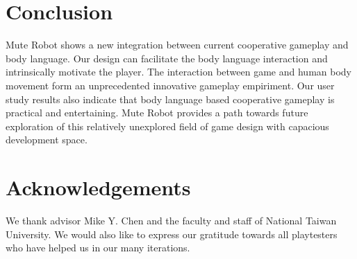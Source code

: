 \documentclass{chi-ext}
\begin{document}

\section{Conclusion}
Mute Robot shows a new integration between current cooperative gameplay and body language.
Our design can facilitate the body language interaction and intrinsically motivate the player.
The interaction between game and human body movement form an unprecedented innovative gameplay empiriment.
Our user study results also indicate that body language based cooperative gameplay is practical and entertaining.
Mute Robot provides a path towards future exploration of this relatively unexplored field of game design with capacious development space.



\section{Acknowledgements}
We thank advisor Mike Y. Chen and the faculty and staff of National Taiwan University.
We would also like to express our gratitude towards all playtesters who have helped us in our many iterations. 



\balance


\end{document}
